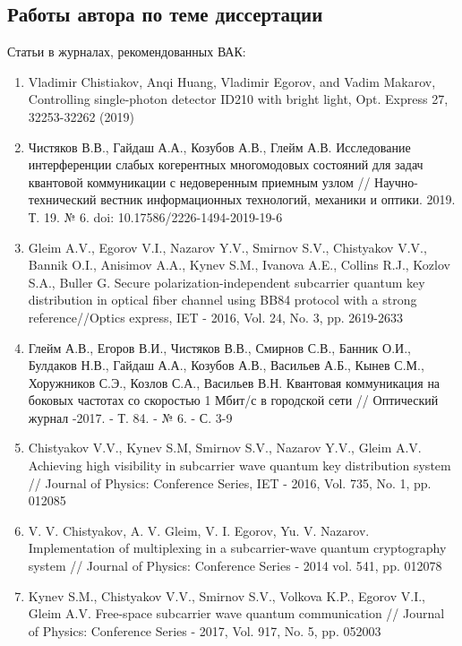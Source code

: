 {\begin{refsection}
	\section*{Работы автора по теме диссертации}
{Статьи в журналах, рекомендованных ВАК: }
\begin{enumerate}\addtolength{\itemsep}{-0.5\baselineskip}
\renewcommand{\labelenumi}{[\theenumi]}
\item Vladimir Chistiakov, Anqi Huang, Vladimir Egorov, and Vadim Makarov, Controlling single-photon detector ID210 with bright light, Opt. Express 27, 32253-32262 (2019)
\\
\item Чистяков В.В., Гайдаш А.А., Козубов А.В., Глейм А.В. Исследование интерференции слабых когерентных многомодовых состояний для задач квантовой коммуникации с недоверенным приемным узлом // Научно-технический вестник информационных технологий, механики и оптики. 2019. Т. 19. № 6. doi: 10.17586/2226-1494-2019-19-6
\\
\item    Gleim A.V., Egorov V.I., Nazarov Y.V., Smirnov S.V., Chistyakov V.V., Bannik O.I., Anisimov A.A., Kynev S.M., Ivanova A.E., Collins R.J., Kozlov S.A., Buller G. Secure polarization-independent subcarrier quantum key distribution in optical fiber channel using BB84 protocol with a strong reference//Optics express, IET - 2016, Vol. 24, No. 3, pp. 2619-2633
\\
\item  Глейм А.В., Егоров В.И., Чистяков В.В., Смирнов С.В., Банник О.И., Булдаков Н.В., Гайдаш А.А., Козубов А.В., Васильев А.Б., Кынев С.М., Хоружников С.Э., Козлов С.А., Васильев В.Н. Квантовая коммуникация на боковых частотах со скоростью 1 Мбит/с в городской сети // Оптический журнал -2017. - Т. 84. - № 6. - С. 3-9
\\
\item  Chistyakov V.V., Kynev S.M, Smirnov S.V., Nazarov Y.V., Gleim A.V. Achieving high visibility in subcarrier wave quantum key distribution system // Journal of Physics: Conference Series, IET - 2016, Vol. 735, No. 1, pp. 012085
\\
\item V. V. Chistyakov, A. V. Gleim, V. I. Egorov, Yu. V. Nazarov. Implementation of multiplexing in a subcarrier-wave quantum cryptography system // Journal of Physics: Conference Series - 2014  vol. 541,  pp. 012078
\\
\item   Kynev S.M., Chistyakov V.V., Smirnov S.V., Volkova K.P., Egorov V.I., Gleim A.V. Free-space subcarrier wave quantum communication // Journal of Physics: Conference Series - 2017, Vol. 917, No. 5, pp. 052003
\\


\end{enumerate}
\end{refsection}}
